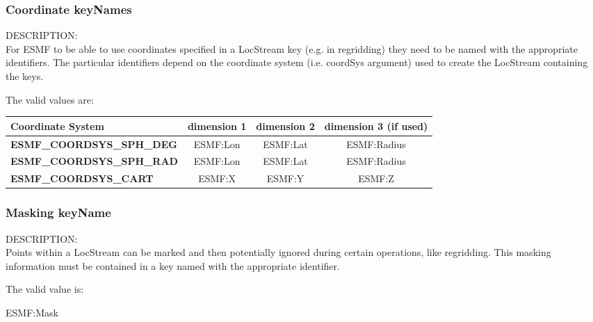 

\subsubsection{Coordinate keyNames}
\label{const:coordkeyname}

{\sf DESCRIPTION:\\}
For ESMF to be able to use coordinates specified in a LocStream key (e.g. in regridding) 
they need to be named with the appropriate identifiers. The particular identifiers depend 
on the coordinate system (i.e. coordSys argument) used to create the LocStream containing 
the keys. 

The valid values are:
\newline
\begin{tabular}{|l|c|c|c||}
\hline
\hline
Coordinate System & {\bf dimension 1}  & {\bf dimension 2} & {\bf dimension 3 (if used)} \\
\hline
{\bf ESMF\_COORDSYS\_SPH\_DEG}  & ESMF:Lon & ESMF:Lat & ESMF:Radius \\
{\bf ESMF\_COORDSYS\_SPH\_RAD}  & ESMF:Lon & ESMF:Lat & ESMF:Radius \\
{\bf ESMF\_COORDSYS\_CART}  & ESMF:X & ESMF:Y & ESMF:Z \\
\hline
\hline
\end{tabular}


\subsubsection{Masking keyName}
\label{const:maskkeyname}

{\sf DESCRIPTION:\\}
Points within a LocStream can be marked and then potentially ignored during certain 
operations, like regridding.  This masking information must be contained in a key 
named with the appropriate identifier.

The valid value is:
\begin{description}
\item [ESMF:Mask] 
\end{description}
